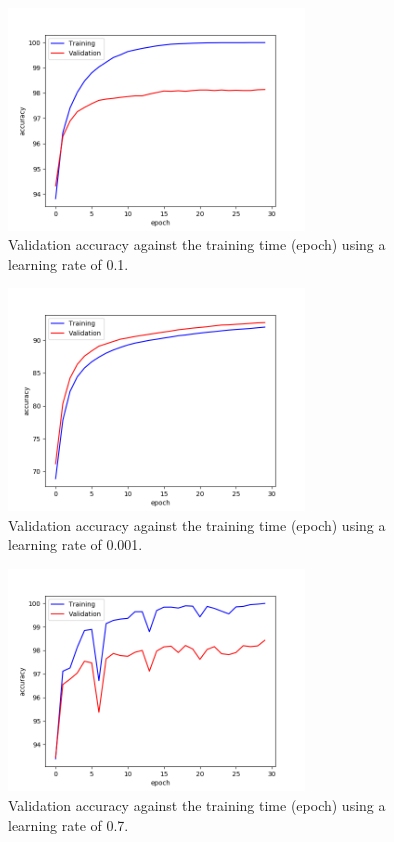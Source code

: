 \documentclass[a4paper]{article}
\begin{document}
\begin{enumerate}
\begin{figure}
\centering
\includegraphics[width=0.7\textwidth]{lr2.png}
\caption{\label{fig:lr2}Validation accuracy against the training time (epoch) using a learning rate of 0.1.}
\end{figure}

\begin{figure}
\centering
\includegraphics[width=0.7\textwidth]{lr3.png}
\caption{\label{fig:lr3}Validation accuracy against the training time (epoch) using a learning rate of 0.001.}
\end{figure}

\begin{figure}
	\centering
	\includegraphics[width=0.7\textwidth]{lr4.png}
	\caption{\label{fig:lr4}Validation accuracy against the training time (epoch) using a learning rate of 0.7.}
\end{figure}


\end{enumerate}
\end{document}
